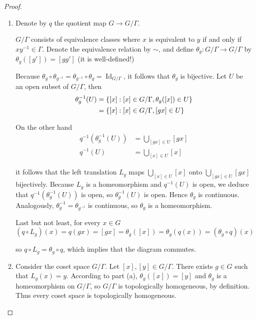 \begin{proof}
    \begin{enumerate}[label={(\alph*)}]
        \item Denote by $q$ the quotient map $G\to G/\Gamma$.

              $G/\Gamma$ consists of equivalence classes where $x$ is equivalent to $y$ if and only if $xy^{-1} \in \Gamma$. Denote the equivalence relation by $\sim$, and define $\theta_{g}: G/\Gamma \to G/\Gamma$ by $\theta_{g}([g']) = [gg']$ (it is well-defined!)

              Because $\theta_{g}\circ \theta_{g^{-1}} = \theta_{g^{-1}}\circ \theta_{g} = \operatorname{Id}_{G/\Gamma}$, it follows that $\theta_{g}$ is bijective. Let $U$ be an open subset of $G/\Gamma$, then
              \begin{align*}
                  \theta_{g}^{-1}(U) & = \left\{{[x] : [x] \in G/\Gamma, \theta_{g}([x]) \in U}\right\} \\
                                     & = \left\{{[x] : [x] \in G/\Gamma, [gx] \in U}\right\}
              \end{align*}

              On the other hand
              \begin{align*}
                  q^{-1}(\theta_{g}^{-1}(U)) & = \bigcup_{[gx] \in U} [gx] \\
                  q^{-1}(U)                  & = \bigcup_{[x] \in U} [x]
              \end{align*}

              it follows that the left translation $L_{g}$ maps $\bigcup_{[x] \in U} [x]$ onto $\bigcup_{[gx] \in U} [gx]$ bijectively. Because $L_{g}$ is a homeomorphism and $q^{-1}(U)$ is open, we deduce that $q^{-1}(\theta_{g}^{-1}(U))$ is open, so $\theta_{g}^{-1}(U)$ is open. Hence $\theta_{g}$ is continuous. Analogously, $\theta_{g}^{-1} = \theta_{g^{-1}}$ is continuous, so $\theta_{g}$ is a homeomorphism.

              Last but not least, for every $x\in G$
              \begin{equation*}
                  (q\circ L_{g})(x) = q(gx) = [gx] = \theta_{g}([x]) = \theta_{g}(q(x)) = (\theta_{g}\circ q)(x)
              \end{equation*}

              so $q\circ L_{g} = \theta_{g}\circ q$, which implies that the diagram commutes.
        \item Consider the coset space $G/\Gamma$. Let $[x], [y] \in G/\Gamma$. There exists $g\in G$ such that $L_{g}(x) = y$. According to part (a), $\theta_{g}([x]) = [y]$ and $\theta_{g}$ is a homeomorphism on $G/\Gamma$, so $G/\Gamma$ is topologically homogeneous, by definition. Thus every coset space is topologically homogeneous.
    \end{enumerate}
\end{proof}

